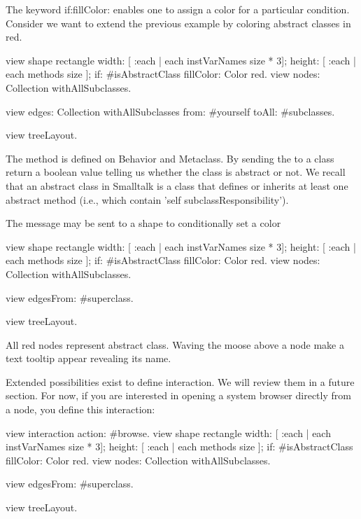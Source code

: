 \documentclass[a4paper,10pt,twoside]{book}
\begin{document}
The keyword if:fillColor: enables one to assign a color for a particular condition. Consider we want to extend the previous example by coloring abstract classes in red.

\begin{code}{}
view shape rectangle
  width: [ :each | each instVarNames size * 3];
  height: [ :each | each methods size ];
  if: #isAbstractClass fillColor: Color red.
view nodes: Collection withAllSubclasses.

view edges: Collection withAllSubclasses from: #yourself toAll: #subclasses.

view treeLayout.
\end{code}

The method  is defined on Behavior and Metaclass. By sending the  to a class return a boolean value telling us whether the class is abstract or not. We recall that an abstract class in Smalltalk is a class that defines or inherits at least one  abstract method (i.e., which contain 'self subclassResponsibility').

The message  may be sent to a shape to conditionally set a color

\begin{code}{}
view shape rectangle
  width: [ :each | each instVarNames size * 3];
  height: [ :each | each methods size ];
  if: #isAbstractClass fillColor: Color red.
view nodes: Collection withAllSubclasses.

view edgesFrom: #superclass.

view treeLayout.
\end{code}

All red nodes represent abstract class. Waving the moose above a node make a text tooltip appear revealing its name. 

Extended possibilities exist to define interaction. We will review them in a future section. For now, if you are interested in opening a system browser directly from a node, you define this interaction:

\begin{code}{}
view interaction action: #browse.
view shape rectangle
  width: [ :each | each instVarNames size * 3];
  height: [ :each | each methods size ];
  if: #isAbstractClass fillColor: Color red.
view nodes: Collection withAllSubclasses.

view edgesFrom: #superclass.

view treeLayout.
\end{code}
\end{document}
